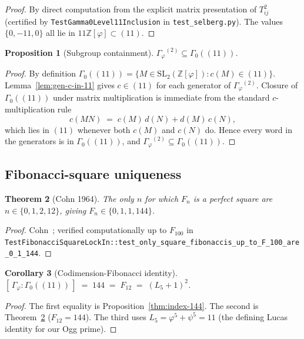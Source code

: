 \documentclass[11pt,a4paper]{article}
\theoremstyle{plain}
\newtheorem{theorem}{Theorem}[section]
\newtheorem{proposition}[theorem]{Proposition}
\newtheorem{corollary}[theorem]{Corollary}
\theoremstyle{definition}
\theoremstyle{remark}
\numberwithin{equation}{section}
\providecommand{\Zp}{\ensuremath{\mathbb{Z}[\varphi]}}
\providecommand{\Gphi}{\ensuremath{\Gamma_{\varphi}}}
\begin{document}
\begin{proof}
By direct computation from the explicit matrix presentation of $T_{ij}^{2}$
(certified by \texttt{TestGamma0Level11Inclusion} in \texttt{test\_selberg.py}).
The values $\{0,-11,0\}$ all lie in $11\Zp\subset(11)$.
\end{proof}

\begin{proposition}[Subgroup containment]\label{thm:gphi-sq-in-gamma0}
$\Gphi^{(2)}\subseteq\Gamma_{0}((11))$.
\end{proposition}

\begin{proof}
By definition $\Gamma_{0}((11))=\{M\in\mathrm{SL}_{2}(\Zp):c(M)\in(11)\}$.
Lemma~\ref{lem:gen-c-in-11} gives $c\in(11)$ for each generator of $\Gphi^{(2)}$.
Closure of $\Gamma_{0}((11))$ under matrix multiplication is immediate from
the standard $c$-multiplication rule
\[
  c(MN) \;=\; c(M)\,d(N) + d(M)\,c(N),
\]
which lies in $(11)$ whenever both $c(M)$ and $c(N)$ do.  Hence every word in
the generators is in $\Gamma_{0}((11))$, and $\Gphi^{(2)}\subseteq\Gamma_{0}((11))$.
\end{proof}

\subsection{Fibonacci-square uniqueness}

\begin{theorem}[Cohn 1964]\label{thm:cohn}
The only $n$ for which $F_{n}$ is a perfect square are $n\in\{0,1,2,12\}$,
giving $F_{n}\in\{0,1,1,144\}$.
\end{theorem}

\begin{proof}
Cohn~\cite{Cohn1964}; verified computationally up to $F_{100}$ in
\texttt{TestFibonacciSquareLockIn::test\_only\_square\_fibonaccis\_up\_to\_F\_100\_are\_0\_1\_144}.
\end{proof}

\begin{corollary}[Codimension-Fibonacci identity]\label{cor:codim-F12}
$[\,\Gphi : \Gamma_{0}((11))\,] \;=\; 144 \;=\; F_{12} \;=\; (L_{5}+1)^{2}$.
\end{corollary}

\begin{proof}
The first equality is Proposition~\ref{thm:index-144}.  The second is
Theorem~\ref{thm:cohn} ($F_{12}=144$).  The third uses $L_{5}=\varphi^{5}+\psi^{5}=11$
(the defining Lucas identity for our Ogg prime).
\end{proof}
\end{document}
